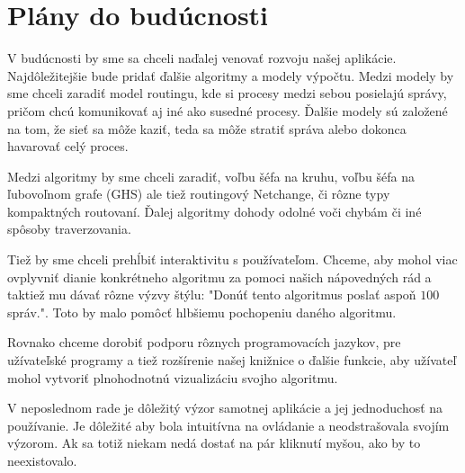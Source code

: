 \section{Plány do budúcnosti}

V budúcnosti by sme sa chceli naďalej venovať rozvoju našej aplikácie. Najdôležitejšie bude pridať
ďalšie algoritmy a modely výpočtu. Medzi modely by sme chceli zaradiť model routingu, kde si procesy
medzi sebou posielajú správy, pričom chcú komunikovať aj iné ako susedné procesy. Ďalšie modely sú
založené na tom, že sieť sa môže kaziť, teda sa môže stratiť správa alebo dokonca havarovať celý
proces.

Medzi algoritmy by sme chceli zaradiť, voľbu šéfa na kruhu, voľbu šéfa na ľubovoľnom grafe
(GHS\cite{ghs}) ale tiež routingový Netchange, či rôzne typy kompaktných routovaní. Ďalej algoritmy dohody odolné voči
chybám či iné spôsoby traverzovania.

Tiež by sme chceli prehĺbiť interaktivitu s používateľom. Chceme, aby mohol viac ovplyvniť dianie
konkrétneho algoritmu za pomoci našich nápovedných rád a taktiež mu dávať rôzne výzvy štýlu: "Donúť
tento algoritmus poslať aspoň $100$ správ.". Toto by malo pomôcť hlbšiemu pochopeniu daného
algoritmu.

Rovnako chceme dorobiť podporu rôznych programovacích jazykov, pre užívateľské programy a tiež
rozšírenie našej knižnice o ďalšie funkcie, aby užívateľ mohol vytvoriť plnohodnotnú vizualizáciu
svojho algoritmu.

V neposlednom rade je dôležitý výzor samotnej aplikácie a jej jednoduchosť na používanie. Je
dôležité aby bola intuitívna na ovládanie a neodstrašovala svojím výzorom. Ak sa totiž niekam nedá
dostať na pár kliknutí myšou, ako by to neexistovalo.

